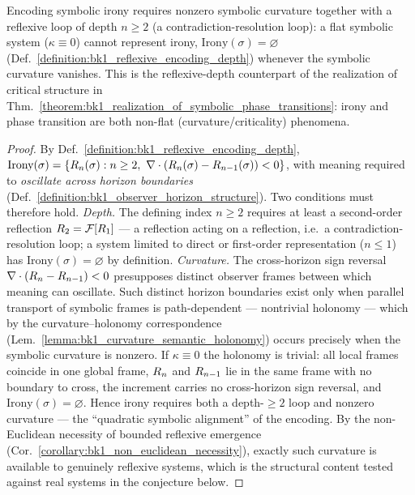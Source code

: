 \begin{theorem}
\label{theorem:bk1_symbolic_irony_requires_curvature}
Encoding symbolic irony requires nonzero symbolic curvature together with a reflexive loop of depth $n\ge2$ (a contradiction-resolution loop): a flat symbolic system ($\kappa\equiv0$) cannot represent irony, $\text{Irony}(\sigma)=\varnothing$ (Def.~\ref{definition:bk1_reflexive_encoding_depth}) whenever the symbolic curvature vanishes. This is the reflexive-depth counterpart of the realization of critical structure in Thm.~\ref{theorem:bk1_realization_of_symbolic_phase_transitions}: irony and phase transition are both non-flat (curvature/criticality) phenomena.
\end{theorem}
\begin{proof}
\label{proof:bk1_symbolic_irony_requires_curvature}
\leavevmode
By Def.~\ref{definition:bk1_reflexive_encoding_depth}, $\text{Irony}(\sigma)=\{\reflect_n(\sigma): n\ge2,\ \nabla\cdot(\reflect_n(\sigma)-\reflect_{n-1}(\sigma))<0\}$, with meaning required to \emph{oscillate across horizon boundaries} (Def.~\ref{definition:bk1_observer_horizon_structure}). Two conditions must therefore hold. \emph{Depth.} The defining index $n\ge2$ requires at least a second-order reflection $R_2=\mathcal{F}[R_1]$ --- a reflection acting on a reflection, i.e.\ a contradiction-resolution loop; a system limited to direct or first-order representation ($n\le1$) has $\text{Irony}(\sigma)=\varnothing$ by definition. \emph{Curvature.} The cross-horizon sign reversal $\nabla\cdot(R_n-R_{n-1})<0$ presupposes distinct observer frames between which meaning can oscillate. Such distinct horizon boundaries exist only when parallel transport of symbolic frames is path-dependent --- nontrivial holonomy --- which by the curvature--holonomy correspondence (Lem.~\ref{lemma:bk1_curvature_semantic_holonomy}) occurs precisely when the symbolic curvature is nonzero. If $\kappa\equiv0$ the holonomy is trivial: all local frames coincide in one global frame, $R_n$ and $R_{n-1}$ lie in the same frame with no boundary to cross, the increment carries no cross-horizon sign reversal, and $\text{Irony}(\sigma)=\varnothing$. Hence irony requires both a depth-$\ge2$ loop and nonzero curvature --- the ``quadratic symbolic alignment'' of the encoding. By the non-Euclidean necessity of bounded reflexive emergence (Cor.~\ref{corollary:bk1_non_euclidean_necessity}), exactly such curvature is available to genuinely reflexive systems, which is the structural content tested against real systems in the conjecture below.
\end{proof}

